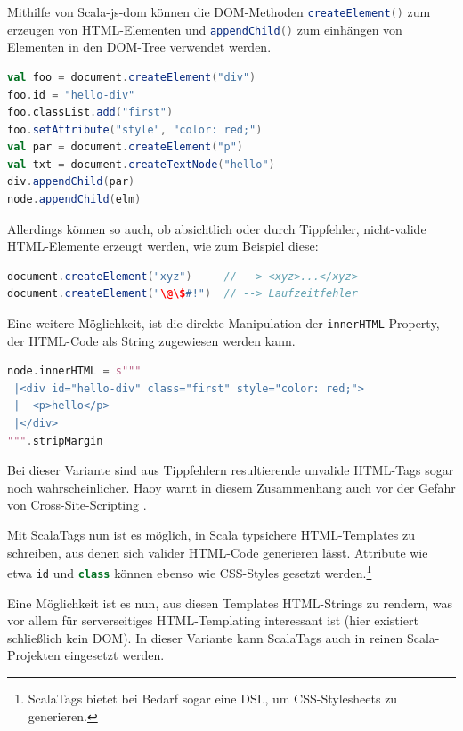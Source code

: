 \documentclass[a4paper, 12pt, hidelinks, listof=totoc, listoftables=totoc, bibliography=totoc]{scrreprt}
\newcommand{\code}[1]{\lstinline[language=Scala, style=inline]|#1|}
\newcommand{\scala}[1]{\lstinline[language=Scala, style=inline]|#1|}
\begin{document}
Mithilfe von Scala-js-dom können die \ac{DOM}-Methoden \scala{createElement()} zum erzeugen von \ac{HTML}-Elementen und \scala{appendChild()} zum einhängen von Elementen in den DOM-Tree verwendet werden.

\begin{lstlisting}[language=Scala, caption={HTML-Generierung mit Scala-js-dom und Nodes.}]
val foo = document.createElement("div")
foo.id = "hello-div"
foo.classList.add("first")
foo.setAttribute("style", "color: red;")
val par = document.createElement("p")
val txt = document.createTextNode("hello")
div.appendChild(par)
node.appendChild(elm)
\end{lstlisting}

Allerdings können so auch, ob absichtlich oder durch Tippfehler, nicht-valide \ac{HTML}-Elemente erzeugt werden, wie zum Beispiel diese:
\begin{lstlisting}[language=Scala, style=snippet]
document.createElement("xyz")     // --> <xyz>...</xyz>
document.createElement("\@\$#!")  // --> Laufzeitfehler
\end{lstlisting}

Eine weitere Möglichkeit, ist die direkte Manipulation der \code{innerHTML}-Property, der \ac{HTML}-Code als String zugewiesen werden kann.

\begin{lstlisting}[language=Scala, caption={HTML-Generierung mit Scala-js-dom und Strings.}]
node.innerHTML = s"""
 |<div id="hello-div" class="first" style="color: red;">
 |  <p>hello</p>
 |</div>
""".stripMargin
\end{lstlisting}

Bei dieser Variante sind aus Tippfehlern resultierende unvalide \ac{HTML}-Tags sogar noch wahrscheinlicher. Haoy warnt in diesem Zusammenhang auch vor der Gefahr von Cross-Site-Scripting \cite[\#HelloWorld:HTML]{haoyi.HOS}.

Mit ScalaTags nun ist es möglich, in Scala typsichere \ac{HTML}-Templates zu schreiben, aus denen sich valider \ac{HTML}-Code generieren lässt. Attribute wie etwa \code{id} und \code{class} können ebenso wie \ac{CSS}-Styles gesetzt werden.\footnote{ScalaTags bietet bei Bedarf sogar eine \ac{DSL}, um \ac{CSS}-Stylesheets zu generieren.}

Eine Möglichkeit ist es nun, aus diesen Templates \ac{HTML}-Strings zu rendern, was vor allem für serverseitiges \ac{HTML}-Templating interessant ist (hier existiert schließlich kein \ac{DOM}). In dieser Variante kann ScalaTags auch in reinen Scala-Projekten eingesetzt werden.
\end{document}
